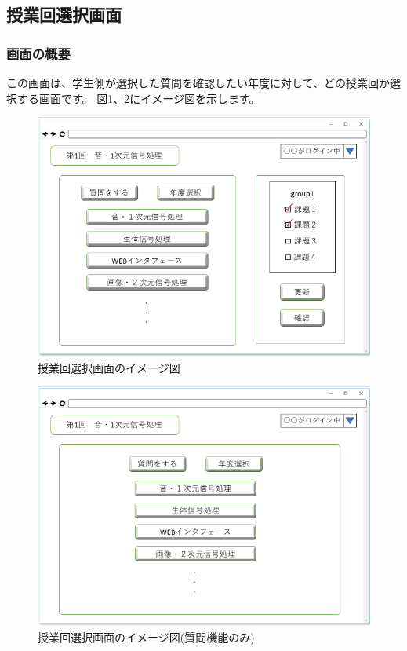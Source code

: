 \newpage

\subsection{授業回選択画面}
\subsubsection{画面の概要}
この画面は、学生側が選択した質問を確認したい年度に対して、どの授業回か選択する画面です。
図\ref{fig:32}、\ref{fig:33}にイメージ図を示します。

\begin{figure}[htbp]
\begin{center}
  \includegraphics[width=1\linewidth,clip]{./img/32.png}
  \caption{授業回選択画面のイメージ図}\label{fig:32}
\end{center}
\end{figure}

\begin{figure}[htbp]
\begin{center}
  \includegraphics[width=1\linewidth,clip]{./img/33.png}
  \caption{授業回選択画面のイメージ図(質問機能のみ)}\label{fig:33}
\end{center}
\end{figure}

